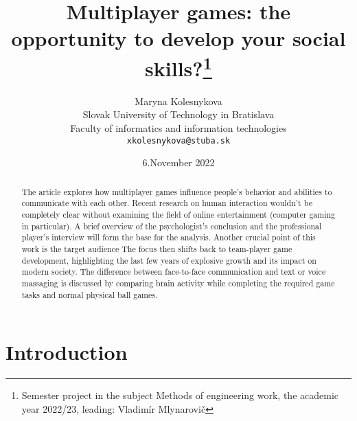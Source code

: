 \documentclass[10pt,twoside,slovak,a4paper]{article}
\title{Multiplayer games: the opportunity to develop your social skills?\thanks{Semester project in the subject Methods of engineering work, the academic year 2022/23, leading: Vladimír Mlynarovič}}
\author{Maryna Kolesnykova\\[2pt]
	{\small Slovak University of Technology in Bratislava}\\
	{\small Faculty of informatics and information technologies}\\
	{\small \texttt{xkolesnykova@stuba.sk}}
	}
\date{\small 6.November 2022}
\begin{document}
\maketitle

\begin{abstract}

The article explores how multiplayer games influence people’s behavior and abilities to communicate with each other. Recent research on human interaction wouldn’t be completely clear without examining the field of online entertainment (computer gaming in particular). A brief overview of the psychologist’s conclusion and the professional player’s interview will form the base for the analysis. Another crucial point of this work is the target audience The focus then shifts back to team-player game development, highlighting the last few years of explosive growth and its impact on modern society. The difference between face-to-face communication and text or voice massaging is discussed by comparing brain activity while completing the required game tasks and normal physical ball games.
\end{abstract}



\section{Introduction}
\end{document}
